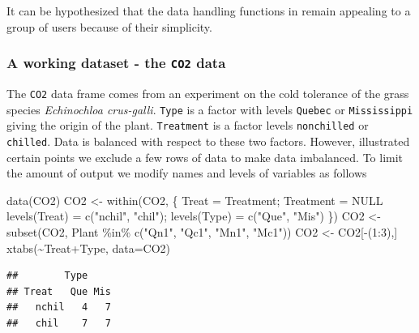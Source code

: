 \documentclass[
]{article}
\newenvironment{Shaded}{\begin{snugshade}}{\end{snugshade}}
\newcommand{\AttributeTok}[1]{\textcolor[rgb]{0.77,0.63,0.00}{#1}}
\newcommand{\ConstantTok}[1]{\textcolor[rgb]{0.00,0.00,0.00}{#1}}
\newcommand{\DecValTok}[1]{\textcolor[rgb]{0.00,0.00,0.81}{#1}}
\newcommand{\FunctionTok}[1]{\textcolor[rgb]{0.00,0.00,0.00}{#1}}
\newcommand{\NormalTok}[1]{#1}
\newcommand{\OtherTok}[1]{\textcolor[rgb]{0.56,0.35,0.01}{#1}}
\newcommand{\SpecialCharTok}[1]{\textcolor[rgb]{0.00,0.00,0.00}{#1}}
\newcommand{\StringTok}[1]{\textcolor[rgb]{0.31,0.60,0.02}{#1}}
\begin{document}
It can be hypothesized that the data handling functions in 
remain appealing to a group of users because of their simplicity.

\hypertarget{a-working-dataset---the-co2-data}{%
\subsubsection{\texorpdfstring{A working dataset - the \texttt{CO2}
data}{A working dataset - the CO2 data}}\label{a-working-dataset---the-co2-data}}

The \texttt{CO2} data frame comes from an experiment on the cold
tolerance of the grass species \emph{Echinochloa crus-galli}.
\texttt{Type} is a factor with levels \texttt{Quebec} or
\texttt{Mississippi} giving the origin of the plant. \texttt{Treatment}
is a factor levels \texttt{nonchilled} or \texttt{chilled}. Data is
balanced with respect to these two factors. However, illustrated certain
points we exclude a few rows of data to make data imbalanced. To limit
the amount of output we modify names and levels of variables as follows

\begin{Shaded}
\begin{Highlighting}[]
\FunctionTok{data}\NormalTok{(CO2)}
\NormalTok{CO2 }\OtherTok{\textless{}{-}} \FunctionTok{within}\NormalTok{(CO2, \{}
\NormalTok{    Treat }\OtherTok{=}\NormalTok{ Treatment; Treatment }\OtherTok{=} \ConstantTok{NULL}
    \FunctionTok{levels}\NormalTok{(Treat) }\OtherTok{=} \FunctionTok{c}\NormalTok{(}\StringTok{"nchil"}\NormalTok{, }\StringTok{"chil"}\NormalTok{); }\FunctionTok{levels}\NormalTok{(Type) }\OtherTok{=} \FunctionTok{c}\NormalTok{(}\StringTok{"Que"}\NormalTok{, }\StringTok{"Mis"}\NormalTok{)}
\NormalTok{\})}
\NormalTok{CO2 }\OtherTok{\textless{}{-}} \FunctionTok{subset}\NormalTok{(CO2, Plant }\SpecialCharTok{\%in\%} \FunctionTok{c}\NormalTok{(}\StringTok{"Qn1"}\NormalTok{, }\StringTok{"Qc1"}\NormalTok{, }\StringTok{"Mn1"}\NormalTok{, }\StringTok{"Mc1"}\NormalTok{))}
\NormalTok{CO2 }\OtherTok{\textless{}{-}}\NormalTok{ CO2[}\SpecialCharTok{{-}}\NormalTok{(}\DecValTok{1}\SpecialCharTok{:}\DecValTok{3}\NormalTok{),]}
\FunctionTok{xtabs}\NormalTok{(}\SpecialCharTok{\textasciitilde{}}\NormalTok{Treat}\SpecialCharTok{+}\NormalTok{Type, }\AttributeTok{data=}\NormalTok{CO2)}
\end{Highlighting}
\end{Shaded}

\begin{verbatim}
##        Type
## Treat   Que Mis
##   nchil   4   7
##   chil    7   7
\end{verbatim}
\end{document}
